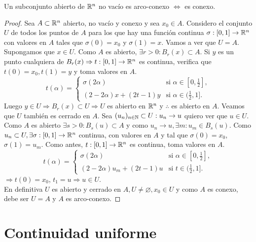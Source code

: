 \begin{theorem}
  Un subconjunto abierto de $\mathbb{R}^n$ no vacío es arco-conexo $\iff$ es conexo.

  \begin{proof}
    Sea $A \subset \mathbb{R}^n$ abierto, no vacío y conexo y sea $x_0 \in A$. Considero el conjunto $U$ de todos los puntos de $A$ para los que hay una función continua $\sigma: [0, 1] \to \mathbb{R}^n$ con valores en $A$ tales que $\sigma(0) = x_0$ y $\sigma(1) = x$. Vamos a ver que $U = A$. \\
    Supongamos que $x \in U$. Como $A$ es abierto, $\exists r > 0 : B_r(x) \subset A$. Si $y$ es un punto cualquiera de $B_r(x) \Rightarrow t: [0, 1] \to \mathbb{R}^n$ es continua, verifica que $t(0) = x_0, t(1) = y$ y toma valores en $A$.
    \begin{equation}
      t(\alpha) = \begin{cases}
        \sigma(2\alpha) & \text{si } \alpha \in [0, \frac{1}{2}], \\
        (2 - 2 \alpha)x + (2t-1)y & \text{si } \alpha \in (\frac{1}{2}, 1].
      \end{cases}
    \end{equation} Luego $y \in U \Rightarrow B_r(x) \subset U \Rightarrow U$ es abierto en $\mathbb{R}^n$ y $\therefore$ es abierto en $A$. Veamos que $U$ también es cerrado en $A$. Sea $(u_n)_{n \in \mathbb{N}} \subset U : u_n \to u$ quiero ver que $u \in U$. Como $A$ es abierto $\exists s > 0 : B_s(u) \subset A$ y como $u_n \to u, \exists m : u_m \in B_s(u)$. Como $u_n \subset U, \exists \sigma: [0, 1] \to \mathbb{R}^n$ continua, con valores en $A$ y tal que $\sigma(0) = x_0$, $\sigma(1) = u_m$. Como antes, $t: [0, 1] \to \mathbb{R}^n$ es continua, toma valores en $A$.
    \begin{equation} t(\alpha) = \begin{cases}
        \sigma(2\alpha) & \text{si } \alpha \in [0, \frac{1}{2}], \\
        (2 - 2\alpha) u_m + (2t - 1) u & \text{si } t \in (\frac{1}{2}, 1].
      \end{cases}
    \end{equation}$\Rightarrow t(0) = x_0$, $t_1 = u \Rightarrow u \in U$. \\
    En definitiva $U$ es abierto y cerrado en $A, U \neq \varnothing, x_0 \in U$ y como $A$ es conexo, debe ser $U = A$ y $A$ es arco-conexo.
  \end{proof}
\end{theorem}

\section{Continuidad uniforme}


